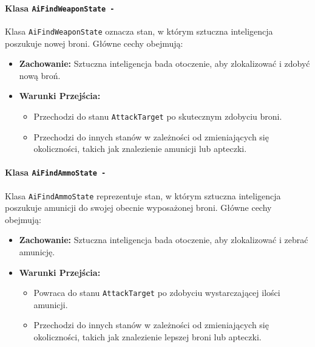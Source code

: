 \paragraph{Klasa \texttt{AiFindWeaponState -}}
Klasa \texttt{AiFindWeaponState} oznacza stan, w którym sztuczna inteligencja poszukuje nowej broni. Główne cechy obejmują:
\begin{itemize}
  \item \textbf{Zachowanie:} Sztuczna inteligencja bada otoczenie, aby zlokalizować i zdobyć nową broń.
  \item \textbf{Warunki Przejścia:}
    \begin{itemize}
      \item Przechodzi do stanu \texttt{AttackTarget} po skutecznym zdobyciu broni.
      \item Przechodzi do innych stanów w zależności od zmieniających się okoliczności, takich jak znalezienie amunicji lub apteczki.
    \end{itemize}
\end{itemize}

\paragraph{Klasa \texttt{AiFindAmmoState -}}
Klasa \texttt{AiFindAmmoState} reprezentuje stan, w którym sztuczna inteligencja poszukuje amunicji do swojej obecnie wyposażonej broni. Główne cechy obejmują:
\begin{itemize}
  \item \textbf{Zachowanie:} Sztuczna inteligencja bada otoczenie, aby zlokalizować i zebrać amunicję.
  \item \textbf{Warunki Przejścia:}
    \begin{itemize}
      \item Powraca do stanu \texttt{AttackTarget} po zdobyciu wystarczającej ilości amunicji.
      \item Przechodzi do innych stanów w zależności od zmieniających się okoliczności, takich jak znalezienie lepszej broni lub apteczki.
    \end{itemize}
\end{itemize}

